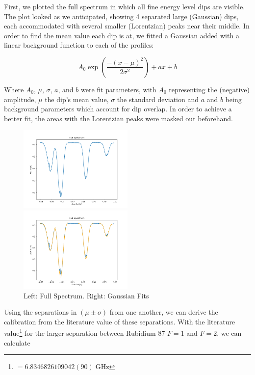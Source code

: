 \documentclass[12pt, a4paper]{article}
\let\oldexp\exp
\renewcommand{\exp}[1]{\ensuremath{\oldexp \left( #1 \right)}}
\begin{document}
First, we plotted the full spectrum in which all fine energy level dips are visible. The plot looked as we anticipated, showing 4 separated large (Gaussian) dips, each accommodated with several smaller (Lorentzian) peaks near their middle. In order to find the mean value each dip is at, we fitted a Gaussian added with a linear background function to each of the profiles:

\begin{equation}
A_0 \exp{\frac{-(x - \mu)^2}{2 \sigma^2}} + ax + b
\label{gaussianfit}
\end{equation}

Where $A_0$, $\mu$, $\sigma$, $a$, and $b$ were fit parameters, with $A_0$ representing the (negative) amplitude, $\mu$ the dip's mean value, $\sigma$ the standard deviation and $a$ and $b$ being background parameters which account for dip overlap. In order to achieve a better fit, the areas with the Lorentzian peaks were masked out beforehand.

\begin{figure}
    \centering
    \parbox{0.45\textwidth}{
        \includegraphics[width=0.5\textwidth]{fullspectrum.png}
    }
    \hfill
    \parbox{0.45\textwidth}{
        \includegraphics[width=0.5\textwidth]{fullspectrumgaussian}    
    }
    \caption{Left: Full Spectrum. Right: Gaussian Fits}
\end{figure}

Using the separations in $(\mu \pm \sigma)$ from one another, we can derive the calibration from the literature value of these separations. With the literature value\footnote{$= 6.8346826109042(90)\;\si{\giga\hertz}$\cite{script}} for the larger separation between Rubidium 87 $F = 1$ and $F = 2$, we can calculate
\end{document}
